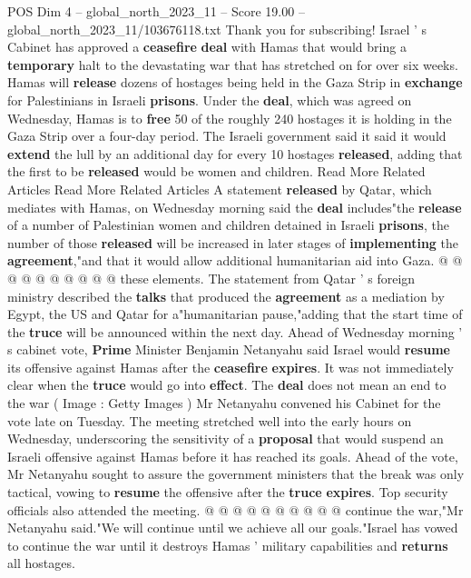 \begin{textsample}{POS Dim 4 – global\_north\_2023\_11 – Score 19.00 – global\_north\_2023\_11/103676118.txt}  \label{ex:f4_pos_278}
Thank you for subscribing!
Israel ' s Cabinet has approved a \textbf{ceasefire} \textbf{deal} with Hamas that would bring a \textbf{temporary} halt to the devastating war that has stretched on for over six weeks.
Hamas will \textbf{release} dozens of hostages being held in the Gaza Strip in \textbf{exchange} for Palestinians in Israeli \textbf{prisons}.
Under the \textbf{deal}, which was agreed on Wednesday, Hamas is to \textbf{free} 50 of the roughly 240 hostages it is holding in the Gaza Strip over a four-day period.
The Israeli government said it said it would \textbf{extend} the lull by an additional day for every 10 hostages \textbf{released}, adding that the first to be \textbf{released} would be women and children.
Read More Related Articles Read More Related Articles A statement \textbf{released} by Qatar, which mediates with Hamas, on Wednesday morning said the \textbf{deal} includes"the \textbf{release} of a number of Palestinian women and children detained in Israeli \textbf{prisons}, the number of those \textbf{released} will be increased in later stages of \textbf{implementing} the \textbf{agreement},"and that it would allow additional humanitarian aid into Gaza. @ @ @ @ @ @ @ @ @ @ these elements.
The statement from Qatar ' s foreign ministry described the \textbf{talks} that produced the \textbf{agreement} as a mediation by Egypt, the US and Qatar for a"humanitarian pause,"adding that the start time of the \textbf{truce} will be announced within the next day.
Ahead of Wednesday morning ' s cabinet vote, \textbf{Prime} Minister Benjamin Netanyahu said Israel would \textbf{resume} its offensive against Hamas after the \textbf{ceasefire} \textbf{expires}.
It was not immediately clear when the \textbf{truce} would go into \textbf{effect}.
The \textbf{deal} does not mean an end to the war ( Image : Getty Images ) Mr Netanyahu convened his Cabinet for the vote late on Tuesday.
The meeting stretched well into the early hours on Wednesday, underscoring the sensitivity of a \textbf{proposal} that would suspend an Israeli offensive against Hamas before it has reached its goals.
Ahead of the vote, Mr Netanyahu sought to assure the government ministers that the break was only tactical, vowing to \textbf{resume} the offensive after the \textbf{truce} \textbf{expires}.
Top security officials also attended the meeting. @ @ @ @ @ @ @ @ @ @ continue the war,"Mr Netanyahu said."We will continue until we achieve all our goals."Israel has vowed to continue the war until it destroys Hamas ' military capabilities and \textbf{returns} all hostages.

\end{textsample}
